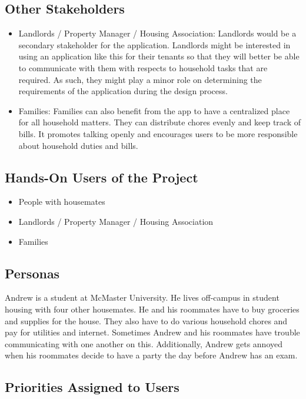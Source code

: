 \documentclass[12pt]{article}
\begin{document}
\subsection{Other Stakeholders}

\begin{itemize}
  \item Landlords / Property Manager / Housing Association: Landlords would be a secondary stakeholder for the application. Landlords might be interested in using an application like this for their tenants so that they will better be able to communicate with them with respects to household tasks that are required. As such, they might play a minor role on determining the requirements of the application during the design process.
  \item Families: Families can also benefit from the app to have a centralized place for all household matters. They can distribute chores evenly and keep track of bills. It promotes talking openly and encourages users to be more responsible about household duties and bills.
\end{itemize}

\subsection{Hands-On Users of the Project}

\begin{itemize}
    \item People with housemates
    \item Landlords / Property Manager / Housing Association
    \item Families
\end{itemize}

\subsection{Personas}
Andrew is a student at McMaster University. He lives off-campus in student housing with four other housemates. He and his roommates have to buy groceries and supplies for the house. They also have to do various household chores and pay for utilities and internet. Sometimes Andrew and his roommates have trouble communicating with one another on this. Additionally, Andrew gets annoyed when his roommates decide to have a party the day before Andrew has an exam.

\subsection{Priorities Assigned to Users}
\end{document}

